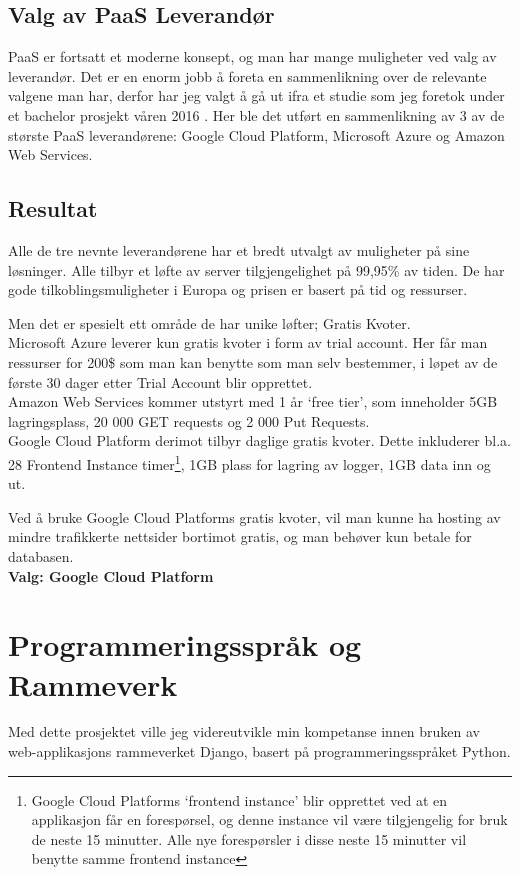 \subsection{Valg av PaaS Leverandør}
PaaS er fortsatt et moderne konsept, og man har mange muligheter ved valg av leverandør. Det er en enorm jobb å foreta en sammenlikning over de relevante valgene man har, derfor har jeg valgt å gå ut ifra et studie som jeg foretok under et bachelor prosjekt våren 2016 \cite[s. 18]{bachelor}. Her ble det utført en sammenlikning av 3 av de største PaaS leverandørene: Google Cloud Platform, Microsoft Azure og Amazon Web Services. 


\subsection*{Resultat}
Alle de tre nevnte leverandørene har et bredt utvalgt av muligheter på sine løsninger. Alle tilbyr et løfte av server tilgjengelighet på 99,95\% av tiden. De har gode tilkoblingsmuligheter i Europa og prisen er basert på tid og ressurser.

Men det er spesielt ett område de har unike løfter; Gratis Kvoter. \\
Microsoft Azure leverer kun gratis kvoter i form av trial account. Her får man ressurser for 200\$ som man kan benytte som man selv bestemmer, i løpet av de første 30 dager etter Trial Account blir opprettet.\\
Amazon  Web Services kommer utstyrt med 1 år ‘free tier’, som inneholder 5GB lagringsplass, 20 000 GET requests og 2 000 Put Requests.\\
Google Cloud Platform derimot tilbyr daglige gratis kvoter. Dette inkluderer bl.a. 28 Frontend Instance timer\footnote{Google Cloud Platforms ‘frontend instance’ blir opprettet ved at en applikasjon får en forespørsel, og denne instance vil være tilgjengelig for bruk de neste 15 minutter. Alle nye forespørsler i disse neste 15 minutter vil benytte samme frontend instance}, 1GB plass for lagring av logger, 1GB data inn og ut.


Ved å bruke Google Cloud Platforms gratis kvoter, vil man kunne ha hosting av mindre trafikkerte nettsider bortimot gratis, og man behøver kun betale for databasen.\\
\textbf{Valg: Google Cloud Platform}



\newpage
\section{Programmeringsspråk og Rammeverk}
Med dette prosjektet ville jeg videreutvikle min kompetanse innen bruken av web-applikasjons rammeverket Django, basert på programmeringsspråket Python. 

